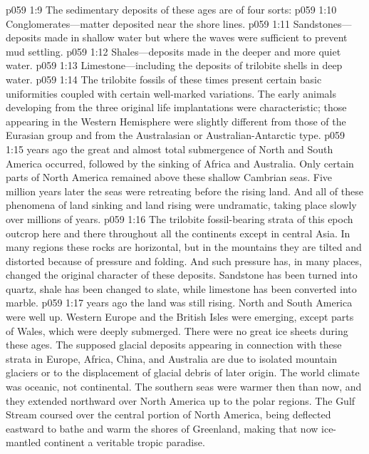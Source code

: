 \pc \vs p059 1:9 The sedimentary deposits of these ages are of four sorts:
\pc \vs p059 1:10 \bibnobreakspace Conglomerates---matter deposited near the shore lines.
\vs p059 1:11 \bibnobreakspace Sandstones---deposits made in shallow water but where the waves were sufficient to prevent mud settling.
\vs p059 1:12 \bibnobreakspace Shales---deposits made in the deeper and more quiet water.
\vs p059 1:13 \bibnobreakspace Limestone---including the deposits of trilobite shells in deep water.
\pc \vs p059 1:14 The trilobite fossils of these times present certain basic uniformities coupled with certain well\hyp{}marked variations. The early animals developing from the three original life implantations were characteristic; those appearing in the Western Hemisphere were slightly different from those of the Eurasian group and from the Australasian or Australian\hyp{}Antarctic type.
\pc \vs p059 1:15  years ago the great and almost total submergence of North and South America occurred, followed by the sinking of Africa and Australia. Only certain parts of North America remained above these shallow Cambrian seas. Five million years later the seas were retreating before the rising land. And all of these phenomena of land sinking and land rising were undramatic, taking place slowly over millions of years.
\vs p059 1:16 The trilobite fossil\hyp{}bearing strata of this epoch outcrop here and there throughout all the continents except in central Asia. In many regions these rocks are horizontal, but in the mountains they are tilted and distorted because of pressure and folding. And such pressure has, in many places, changed the original character of these deposits. Sandstone has been turned into quartz, shale has been changed to slate, while limestone has been converted into marble.
\pc \vs p059 1:17  years ago the land was still rising. North and South America were well up. Western Europe and the British Isles were emerging, except parts of Wales, which were deeply submerged. There were no great ice sheets during these ages. The supposed glacial deposits appearing in connection with these strata in Europe, Africa, China, and Australia are due to isolated mountain glaciers or to the displacement of glacial debris of later origin. The world climate was oceanic, not continental. The southern seas were warmer then than now, and they extended northward over North America up to the polar regions. The Gulf Stream coursed over the central portion of North America, being deflected eastward to bathe and warm the shores of Greenland, making that now ice\hyp{}mantled continent a veritable tropic paradise.
